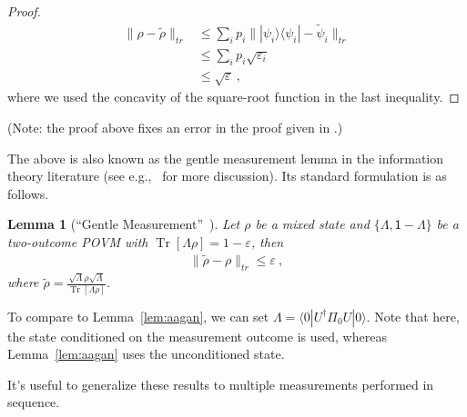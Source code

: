 \documentclass[11pt]{report}
\theoremstyle{plain}
\newtheorem{lemma}[theorem]{Lemma}
\theoremstyle{definition}
\newcommand{\eps}{\varepsilon}
\renewcommand{\bra}[1]{\langle#1|}
\renewcommand{\ket}[1]{|#1\rangle}
\newcommand{\ketbra}[2]{|#1\rangle\!\langle#2|}
\newcommand{\proj}[1]{\ketbra{#1}{#1}}
\newcommand{\Tr}{\operatorname{Tr}}
\begin{document}
\begin{proof}
\begin{align*}
\|\rho - \tilde{\rho} \|_{tr} &\leq \sum_i p_i \| \proj{\psi_i} - \tilde{\psi}_i \|_{tr} \\
&\leq \sum_{i} p_i \sqrt{\eps_i} \\
&\leq \sqrt{\eps} \ ,
\end{align*}
where we used the concavity of the square-root function in the last inequality.
\end{proof}

(Note: the proof above fixes an error in the proof given in \cite{aar:adv}.)

The above is also known as the gentle measurement lemma in the information theory literature (see e.g.,~\cite[Section 9.4]{wildebook} for more discussion). Its standard formulation is as follows.
\begin{lemma}[``Gentle Measurement''~\cite{gentle}]
Let $\rho$ be a mixed state and $\{\Lambda, \mathsf{1}-\Lambda\}$ be a two-outcome POVM with $\Tr[\Lambda \rho] = 1-\eps$, then
\begin{align*}
\| \tilde{\rho} - \rho \|_{tr} \leq \eps \ ,
\end{align*}
where $\tilde{\rho} = \frac{\sqrt{\Lambda} \rho \sqrt{\Lambda}}{\Tr[\Lambda \rho]}$.
\end{lemma}
To compare to Lemma~\ref{lem:aagan}, we can set $\Lambda = \bra{0} U^{\dagger} \Pi_0 U \ket{0}$. Note that here, the state conditioned on the measurement outcome is used, whereas Lemma~\ref{lem:aagan} uses the unconditioned state.

It's useful to generalize these results to multiple measurements performed in sequence.
\end{document}
